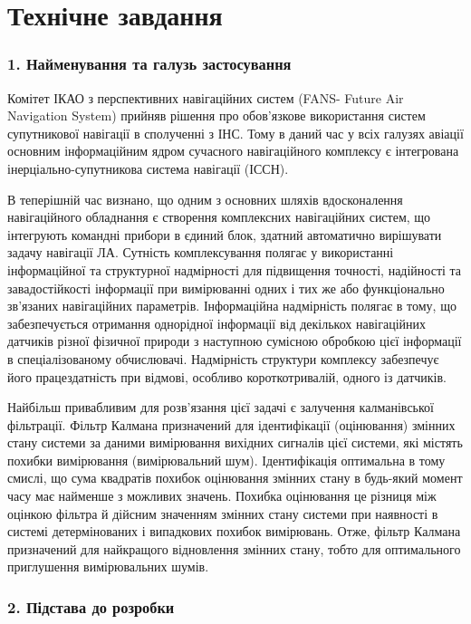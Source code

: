 \documentclass[ukrainian,utf8,simple,floatsingle,hpadding=5mm]{eskdtext}
\begin{document}


\section*{Технічне завдання}

\subsubsection*{1. Найменування та галузь застосування}
Комітет ІКАО з перспективних навігаційних систем (FANS- Future Air Navigation System) прийняв 
рішення про обов'язкове використання систем супутникової навігації в сполученні з ІНС. Тому в 
даний час у всіх галузях авіації основним інформаційним ядром сучасного навігаційного комплексу 
є інтегрована інерціально-супутникова система навігації (ІССН).

В теперішній час визнано, що одним з основних шляхів вдосконалення навігаційного обладнання 
є створення комплексних навігаційних систем, що інтегрують  командні прибори в єдиний блок, 
здатний автоматично вирішувати задачу навігації ЛА. Сутність комплексування полягає у 
використанні інформаційної та структурної надмірності для підвищення точності, надійності 
та завадостійкості інформації при вимірюванні одних і тих же або функціонально зв’язаних 
навігаційних параметрів. Інформаційна надмірність полягає в тому, що забезпечується отримання 
однорідної інформації від декількох навігаційних датчиків різної фізичної природи з наступною 
сумісною обробкою цієї інформації в спеціалізованому обчислювачі. Надмірність структури 
комплексу забезпечує його працездатність при відмові, особливо короткотривалій, одного із датчиків. 


Найбільш привабливим для розв’язання цієї задачі є залучення калманівської фільтрації. 
Фільтр Калмана призначений для ідентифікації (оцінювання) змінних стану системи за даними 
вимірювання вихідних сигналів цієї системи, які містять похибки вимірювання (вимірювальний шум). 
Ідентифікація оптимальна в тому смислі, що сума квадратів похибок оцінювання змінних стану
в будь-який момент часу має найменше з можливих значень. Похибка оцінювання це різниця 
між оцінкою фільтра й дійсним значенням змінних стану системи при наявності в системі 
детермінованих і випадкових похибок вимірювань. Отже, фільтр Калмана призначений для 
найкращого  відновлення змінних стану, тобто для оптимального приглушення вимірювальних шумів.

\subsubsection*{2. Підстава до розробки}
\end{document}
